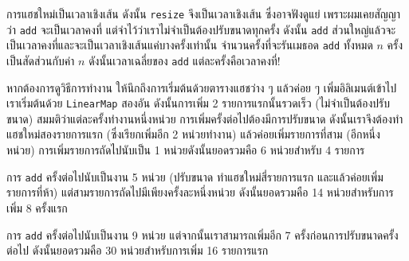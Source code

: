 
การแฮชใหม่เป็นเวลาเชิงเส้น ดังนั้น {\tt resize} จึงเป็นเวลาเชิงเส้น 
ซึ่งอาจฟังดูแย่ เพราะผมเคยสัญญาว่า {\tt add} จะเป็นเวลาคงที่ แต่จำไว้ว่าเราไม่จำเป็นต้องปรับขนาดทุกครั้ง 
ดังนั้น {\tt add} ส่วนใหญ่แล้วจะเป็นเวลาคงที่และจะเป็นเวลาเชิงเส้นแค่บางครั้งเท่านั้น 
จำนวนครั้งที่จะรันเมธอด {\tt add} ทั้งหมด  {\scriptsize$n$} ครั้งเป็นสัดส่วนกับค่า {\scriptsize$n$} ดังนั้นเวลาเฉลี่ยของ {\tt add} แต่ละครั้งคือเวลาคงที่!


หากต้องการดูวิธีการทำงาน ให้นึกถึงการเริ่มต้นด้วยตารางแฮชว่าง ๆ แล้วค่อย ๆ เพิ่มอิลิเมนต์เข้าไป
เราเริ่มต้นด้วย \texttt{LinearMap} สองอัน ดังนั้นการเพิ่ม 2 รายการแรกนั้นรวดเร็ว (ไม่จำเป็นต้องปรับขนาด) 
สมมติว่าแต่ละครั้งทำงานหนึ่งหน่วย การเพิ่มครั้งต่อไปต้องมีการปรับขนาด 
ดังนั้นเราจึงต้องทำแฮชใหม่สองรายการแรก (ซึ่งเรียกเพิ่มอีก 2 หน่วยทำงาน) 
แล้วค่อยเพิ่มรายการที่สาม (อีกหนึ่งหน่วย) การเพิ่มรายการถัดไปนับเป็น 1 หน่วยดังนั้นยอดรวมคือ 6 หน่วยสำหรับ 4 รายการ


การ {\tt add} ครั้งต่อไปนับเป็นงาน 5 หน่วย (ปรับขนาด ทำแฮชใหม่สี่รายการแรก และแล้วค่อยเพิ่มรายการที่ห้า) แต่สามรายการถัดไปมีเพียงครั้งละหนึ่งหน่วย ดังนั้นยอดรวมคือ 14 หน่วยสำหรับการเพิ่ม 8 ครั้งแรก


การ {\tt add} ครั้งต่อไปนับเป็นงาน 9 หน่วย แต่จากนั้นเราสามารถเพิ่มอีก 7 ครั้งก่อนการปรับขนาดครั้งต่อไป ดังนั้นยอดรวมคือ 30 หน่วยสำหรับการเพิ่ม 16 รายการแรก

